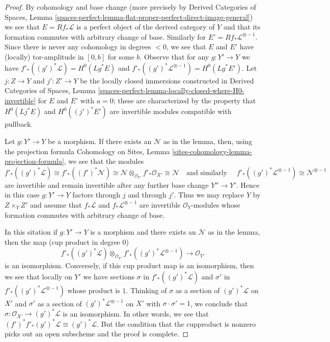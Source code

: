 \begin{proof}
By cohomology and base change (more precisely by
Derived Categories of Spaces, Lemma
\ref{spaces-perfect-lemma-flat-proper-perfect-direct-image-general})
we see that $E = Rf_*\mathcal{L}$ is a perfect object of the
derived category of $Y$ and that its formation commutes with
arbitrary change of base. Similarly for $E' = Rf_*\mathcal{L}^{\otimes -1}$.
Since there is never any cohomology in degrees $< 0$, we see that
$E$ and $E'$ have (locally) tor-amplitude in $[0, b]$ for some $b$.
Observe that for any $g : Y' \to Y$ we have
$f'_*((g')^*\mathcal{L}) = H^0(Lg^*E)$ and
$f'_*((g')^*\mathcal{L}^{\otimes -1}) = H^0(Lg^*E')$.
Let $j : Z \to Y$ and $j' : Z' \to Y$ be the locally closed
immersions constructed in Derived Categories of Spaces, Lemma
\ref{spaces-perfect-lemma-locally-closed-where-H0-invertible}
for $E$ and $E'$ with $a = 0$; these are characterized
by the property that $H^0(Lj^*E)$ and $H^0((j')^*E')$
are invertible modules compatible with pullback.

\medskip\noindent
Let $g : Y' \to Y$ be a morphism. If there exists an $\mathcal{N}$
as in the lemma, then, using the projection formula
Cohomology on Sites, Lemma \ref{sites-cohomology-lemma-projection-formula},
we see that the modules
$$
f'_*((g')^*\mathcal{L}) \cong
f'_*((f')^*\mathcal{N}) \cong
\mathcal{N} \otimes_{\mathcal{O}_{Y'}} f'_*\mathcal{O}_{X'} \cong
\mathcal{N}\quad\text{and similarly }\quad
f'_*((g')^*\mathcal{L}^{\otimes -1}) \cong \mathcal{N}^{\otimes -1}
$$
are invertible and remain invertible after any further base change $Y'' \to Y'$.
Hence in this case $g : Y' \to Y$ factors through $j$ and through $j'$.
Thus we may replace $Y$ by $Z \times_Y Z'$ and assume that
$f_*\mathcal{L}$ and $f_*\mathcal{L}^{\otimes -1}$ are invertible
$\mathcal{O}_Y$-modules whose formation commutes with arbitrary change of base.

\medskip\noindent
In this sitation if $g : Y' \to Y$ is a morphism and there exists an
$\mathcal{N}$ as in the lemma, then the map (cup product in degree $0$)
$$
f'_*((g')^*\mathcal{L})
\otimes_{\mathcal{O}_{Y'}}
f'_*((g')^*\mathcal{L}^{\otimes -1})
\longrightarrow \mathcal{O}_{Y'}
$$
is an isomorphism. Conversely, if this cup product map is an isomorphism,
then we see that locally on $Y'$ we have sections
$\sigma$ in $f'_*((g')^*\mathcal{L})$ and $\sigma'$ in
$f'_*((g')^*\mathcal{L}^{\otimes -1})$ whose product is $1$.
Thinking of $\sigma$ as a section of $(g')^*\mathcal{L}$ on $X'$
and $\sigma'$ as a section of $(g')^*\mathcal{L}^{\otimes -1}$ on $X'$
with $\sigma \cdot \sigma' = 1$, we conclude that
$\sigma : \mathcal{O}_{X'} \to (g')^*\mathcal{L}$ is an isomorphism.
In other words, we see that
$(f')^*f'_*(g')^*\mathcal{L} \cong (g')^*\mathcal{L}$.
But the condition that the cupproduct is nonzero picks
out an open subscheme and the proof is complete.
\end{proof}










